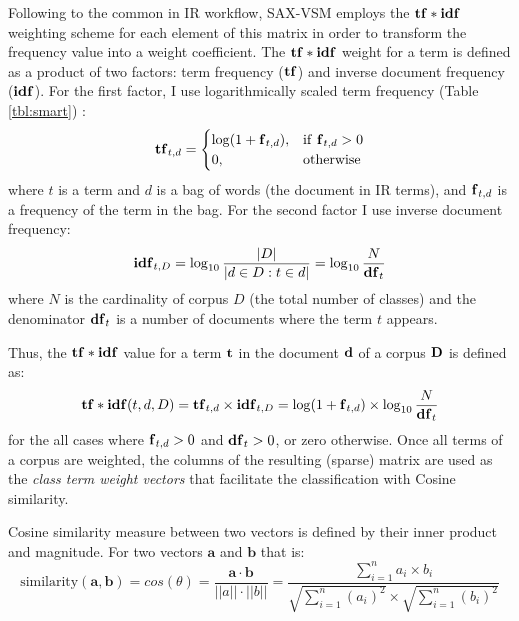 Following to the common in IR workflow, SAX-VSM employs the $\text{\textbf{tf}}\ast\text{\textbf{idf}}$ weighting scheme 
\cite{citeulike:4469058} for each element of this matrix in order to transform the frequency value into a 
weight coefficient. 
The $\text{\textbf{tf}}\ast\text{\textbf{idf}}$ weight for a term is defined as a product of two factors: term frequency ($\text{\textbf{tf}}$) 
and inverse document frequency ($\text{\textbf{idf}}$). 
For the first factor, I use logarithmically scaled term frequency (Table \ref{tbl:smart}) \cite{citeulike:4469058}:
\begin{equation}
 \mbox{\textbf{tf}}_{t, d} =  \begin{cases} \log(1 + \mbox{\textbf{f}}_{t,d}), &\mbox{if \textbf{f}}_{t,d}>0  \\
0, & \mbox{otherwise} \end{cases}
\end{equation} 
where $t$ is a term and $d$ is a bag of words (the document in IR terms), and $\mbox{\textbf{f}}_{t,d}$ 
is a frequency of the term in the bag.
For the second factor I use inverse document frequency:
\begin{equation}
 \mbox{\textbf{idf}}_{t, D} =  \log_{10}\frac{|D|}{|d \in D : t \in d|} = \log_{10}\frac{N}{\mbox{\textbf{df}}_{t}}
 \label{formula:idf}
\end{equation} 
where $N$ is the cardinality of corpus $D$ (the total number of classes) and the 
denominator $\mbox{\textbf{df}}_{t}$ is a number of documents where the term $t$ appears.

Thus, the $\text{\textbf{tf}} \ast \text{\textbf{idf}}$ value for a term $\text{\textbf{t}}$ in the document 
$\text{\textbf{d}}$ of a corpus $\text{\textbf{D}}$ is defined as:
\begin{equation}
 \text{\textbf{tf}} \ast \text{\textbf{idf}}(t, d, D) =  \text{\textbf{tf}}_{t, d} \times \text{\textbf{idf}}_{t, D} = \log(1 + \text{\textbf{f}}_{t,d})
\times \log_{10}\frac{N}{\mbox{\textbf{df}}_{t}}
 \label{formula:tfidf}
\end{equation} 
for the all cases where $\mbox{\textbf{f}}_{t,d}>0$ and $\mbox{\textbf{df}}_{t}>0$, or zero otherwise.
Once all terms of a corpus are weighted, the columns of the resulting (sparse) matrix are used as the 
\textit{class term weight vectors} that facilitate the classification with Cosine similarity. 

Cosine similarity measure between two vectors is defined by their inner product and magnitude. 
For two vectors $\mathbf{a}$ and $\mathbf{b}$ that is:
\begin{equation}
\mbox{similarity}(\mathbf{a},\mathbf{b}) = cos(\theta) = 
\frac{ \mathbf{a} \cdot \mathbf{b} } {\left| \left| a \right| \right| \cdot \left| \left| b \right|\right|} =
\frac{ \sum\limits_{i=1}^{n}{a_{i} \times b_{i}} }{ \sqrt{\sum\limits_{i=1}^{n}{(a_{i})^2}} \times \sqrt{\sum\limits_{i=1}^{n}{(b_{i})^2}}}
\end{equation} 

